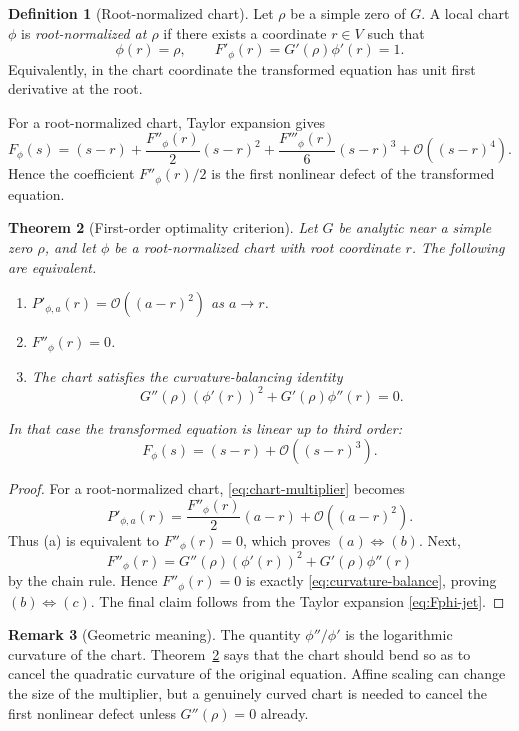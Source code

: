 \documentclass[11pt]{article}
\newtheorem{theorem}{Theorem}[section]
\theoremstyle{definition}
\newtheorem{definition}[theorem]{Definition}
\newtheorem{remark}[theorem]{Remark}
\newcommand{\Oterm}{\mathcal{O}}
\begin{document}
\begin{definition}[Root-normalized chart]
Let $\rho$ be a simple zero of $G$. A local chart $\phi$ is \emph{root-normalized at $\rho$} if there exists a coordinate $r\in V$ such that
\[
\phi(r)=\rho,
\qquad
F'_{\phi}(r)=G'(\rho)\phi'(r)=1.
\]
Equivalently, in the chart coordinate the transformed equation has unit first derivative at the root.
\end{definition}

For a root-normalized chart, Taylor expansion gives
\begin{equation}\label{eq:Fphi-jet}
F_{\phi}(s)=(s-r)+\frac{F''_{\phi}(r)}{2}(s-r)^2+\frac{F'''_{\phi}(r)}{6}(s-r)^3+\Oterm((s-r)^4).
\end{equation}
Hence the coefficient $F''_{\phi}(r)/2$ is the first nonlinear defect of the transformed equation.

\begin{theorem}[First-order optimality criterion]\label{thm:optimality}
Let $G$ be analytic near a simple zero $\rho$, and let $\phi$ be a root-normalized chart with root coordinate $r$. The following are equivalent.
\begin{enumerate}[label=(\alph*)]
    \item $P'_{\phi,a}(r)=\Oterm((a-r)^2)$ as $a\to r$.
    \item $F''_{\phi}(r)=0$.
    \item The chart satisfies the curvature-balancing identity
    \begin{equation}\label{eq:curvature-balance}
    G''(\rho)(\phi'(r))^2+G'(\rho)\phi''(r)=0.
    \end{equation}
\end{enumerate}
In that case the transformed equation is linear up to third order:
\[
F_{\phi}(s)=(s-r)+\Oterm((s-r)^3).
\]
\end{theorem}

\begin{proof}
For a root-normalized chart, \eqref{eq:chart-multiplier} becomes
\[
P'_{\phi,a}(r)=\frac{F''_{\phi}(r)}{2}(a-r)+\Oterm((a-r)^2).
\]
Thus (a) is equivalent to $F''_{\phi}(r)=0$, which proves $(a)\Leftrightarrow (b)$. Next,
\[
F''_{\phi}(r)=G''(\rho)(\phi'(r))^2+G'(\rho)\phi''(r)
\]
by the chain rule. Hence $F''_{\phi}(r)=0$ is exactly \eqref{eq:curvature-balance}, proving $(b)\Leftrightarrow (c)$. The final claim follows from the Taylor expansion \eqref{eq:Fphi-jet}.
\end{proof}

\begin{remark}[Geometric meaning]
The quantity $\phi''/\phi'$ is the logarithmic curvature of the chart. Theorem~\ref{thm:optimality} says that the chart should bend so as to cancel the quadratic curvature of the original equation. Affine scaling can change the size of the multiplier, but a genuinely curved chart is needed to cancel the first nonlinear defect unless $G''(\rho)=0$ already.
\end{remark}
\end{document}
